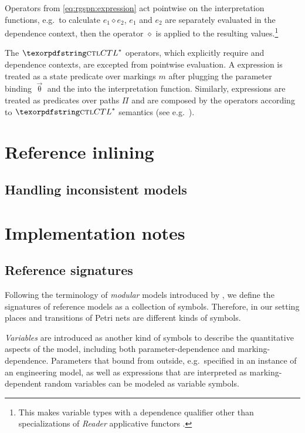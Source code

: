 Operators from \vref{eq:rgspn:expression} act pointwise on the interpretation functions, e.g.~to calculate \(e_1 \mathbin{\diamond} e_2\), \(e_1\) and \(e_2\) are separately evaluated in the dependence context, then the operator \(\diamond\) is applied to the resulting values.\footnote{This makes variable types with a dependence qualifier other than  specializations of \emph{Reader} applicative functors .}

The \(\textabbr{CTL}^*\) operators, which explicitly require  and  dependence contexts, are excepted from pointwise evaluation. A  expression is treated as a state predicate over markings \(m\) after plugging the parameter binding \(\vec{\uptheta}\) and the  into the interpretation function. Similarly,  expressions are treated as predicates over paths \(\Pi\) and are composed by the operators according to \(\textabbr{CTL}^*\) semantics (see e.g.~).

\section{Reference inlining}
\label{sec:rgspn:inlining}

\subsection{Handling inconsistent models}
\label{ssec:rgspn:inconsistent}

\section{Implementation notes}


\subsection{Reference  signatures}

Following the terminology of \emph{modular } models introduced by \citet{Kindler01modular}, we define the signatures of reference  models as a collection of symbols. Therefore, in our setting places and transitions of Petri nets are different kinds of symbols.

\emph{Variables} are introduced as another kind of symbols to describe the quantitative aspects of the model, including both parameter-dependence and marking-dependence. Parameters that bound from outside, e.g.\ specified in an instance of an engineering model, as well as expressions that are interpreted as marking-dependent random variables can be modeled as variable symbols.

